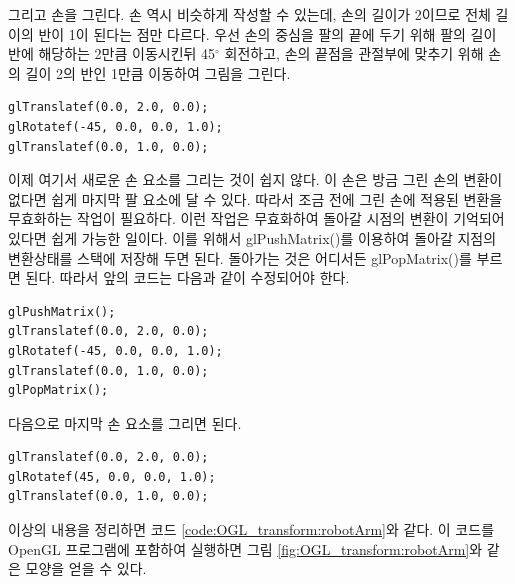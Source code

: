 그리고 손을 그린다.  손 역시 비슷하게 작성할 수 있는데, 손의 길이가 2이므로 전체 길이의 반이 1이 된다는 점만 다르다.
우선 손의 중심을 팔의 끝에 두기 위해 팔의 길이 반에 해당하는 2만큼 이동시킨뒤 45$^{\circ}$ 회전하고, 손의 끝점을 관절부에 맞추기 위해 손의 길이 2의 반인 1만큼 이동하여 그림을 그린다.

\begin{verbatim}
glTranslatef(0.0, 2.0, 0.0);
glRotatef(-45, 0.0, 0.0, 1.0);
glTranslatef(0.0, 1.0, 0.0);
\end{verbatim}

이제 여기서 새로운 손 요소를 그리는 것이 쉽지 않다. 이 손은 방금 그린 손의 변환이 없다면 쉽게 마지막 팔 요소에 달 수 있다. 따라서 조금 전에 그린 손에 적용된 변환을 무효화하는 작업이 필요하다. 이런 작업은 무효화하여 돌아갈 시점의 변환이 기억되어 있다면 쉽게 가능한 일이다. 이를 위해서 {\sf glPushMatrix()}를 이용하여 돌아갈 지점의 변환상태를 스택에 저장해 두면 된다. 돌아가는 것은 어디서든 {\sf glPopMatrix()}를 부르면 된다. 따라서 앞의 코드는 다음과 같이 수정되어야 한다.

\begin{verbatim}
glPushMatrix();
glTranslatef(0.0, 2.0, 0.0); 
glRotatef(-45, 0.0, 0.0, 1.0);
glTranslatef(0.0, 1.0, 0.0);
glPopMatrix();
\end{verbatim}

다음으로 마지막 손 요소를 그리면 된다.

\begin{verbatim}
glTranslatef(0.0, 2.0, 0.0); 
glRotatef(45, 0.0, 0.0, 1.0);
glTranslatef(0.0, 1.0, 0.0);
\end{verbatim}

이상의 내용을 정리하면 코드 \ref{code:OGL_transform:robotArm}와 같다. 이 코드를 OpenGL 프로그램에
포함하여 실행하면 그림 \ref{fig:OGL_transform:robotArm}와 같은 모양을 얻을 수 있다.


